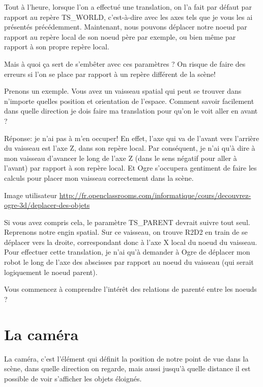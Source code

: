 \documentclass[10pt,a4paper]{report}
\begin{document}
Tout \`{a} l'heure, lorsque l'on a effectu\'e une translation, on l'a fait par d\'efaut par rapport au rep\`ere TS\_WORLD, c'est-\`{a}-dire avec les axes tels que je vous les ai pr\'esent\'es pr\'ec\'edemment. Maintenant, nous pouvons d\'eplacer notre noeud par rapport au rep\`ere local de son noeud p\`ere par exemple, ou bien m\^eme par rapport \`{a} son propre rep\`ere local.

Mais \`{a} quoi \c{c}a sert de s'emb\^eter avec ces param\`etres ? On risque de faire des erreurs si l'on se place par rapport \`{a} un rep\`ere diff\'erent de la sc\`ene!

Prenons un exemple. Vous avez un vaisseau spatial qui peut se trouver dans n'importe quelles position et orientation de l'espace. Comment savoir facilement dans quelle direction je dois faire ma translation pour qu'on le voit aller en avant ?

R\'eponse: je n'ai pas \`{a} m'en occuper! En effet, l'axe qui va de l'avant vers l'arri\`ere du vaisseau est l'axe Z, dans son rep\`ere local. Par cons\'equent, je n'ai qu'\`{a} dire \`{a} mon vaisseau d'avancer le long de l'axe Z (dans le sens n\'egatif pour aller \`{a} l'avant) par rapport \`{a} son rep\`ere local. Et Ogre s'occupera gentiment de faire les calculs pour placer mon vaisseau correctement dans la sc\`ene.

Image utilisateur \url{http://fr.openclassrooms.com/informatique/cours/decouvrez-ogre-3d/deplacer-des-objets}

Si vous avez compris cela, le param\`etre TS\_PARENT devrait suivre tout seul. Reprenons notre engin spatial.
Sur ce vaisseau, on trouve R2D2 en train de se d\'eplacer vers la droite, correspondant donc \`{a} l'axe X local du noeud du vaisseau. Pour effectuer cette translation, je n'ai qu'\`{a} demander \`{a} Ogre de d\'eplacer mon robot le long de l'axe des abscisses par rapport au noeud du vaisseau (qui serait logiquement le noeud parent).

Vous commencez \`{a} comprendre l'int\'er\^et des relations de parent\'e entre les noeuds ?









\section{La cam\'era}


La cam\'era, c'est l'\'el\'ement qui d\'efinit la position de notre point de vue dans la sc\`ene, dans quelle direction on regarde, mais aussi jusqu'\`{a} quelle distance il est possible de voir s'afficher les objets \'eloign\'es.
\end{document}
